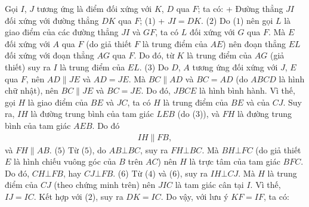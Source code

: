 \begin{multicols}{2}
\begin{figure}[H]
		\vspace*{-10pt}
	\end{figure}
	Gọi $I$, $J$ tương ứng là điểm đối xứng với $K$, $D$ qua $F$; ta có:
	\vskip 0.05cm
	+ Đường thẳng $JI$ đối xứng với đường thẳng $DK$ qua $F$; \hfill ($1$)
	\vskip 0.05cm
	+ $JI = DK$. \hfill ($2$)
	\vskip 0.05cm
	Do ($1$) nên gọi $L$ là giao điểm của các đường thẳng $JI$ và $GF$, ta có $L$ đối xứng với $G$ qua $F$. Mà $E$ đối xứng với $A$ qua $F$ (do giả thiết $F$ là trung điểm của $AE$) nên đoạn thẳng $EL$ đối xứng với đoạn thẳng $AG$ qua $F$. Do đó, từ $K$ là trung điểm của $AG$ (giả thiết) suy ra $I$ là trung điểm của $EL$. \hfill ($3$)
	\vskip 0.05cm
	Do $D$, $A$ tương ứng đối xứng với $J$, $E$ qua $F$, nên $AD \parallel JE$ và $AD = JE$. Mà $BC \parallel AD$ và $BC = AD$ (do $ABCD$ là hình chữ nhật), nên $BC \parallel JE$ và $BC = JE$. Do đó, $JBCE$ là hình bình hành. Vì thế, gọi $H$ là giao điểm của $BE$ và $JC$, ta có $H$ là trung điểm của $BE$ và của $CJ$. Suy ra, $IH$ là đường trung bình của tam giác $LEB$ (do ($3$)), và $FH$ là đường trung bình của tam giác $AEB$. Do đó
	\begin{align*}
		IH \parallel FB, \tag{$4$}
	\end{align*}
	và \hspace*{60.5pt}  $FH \parallel AB$. \hfill ($5$)
	\vskip 0.05cm
	Từ ($5$), do $AB \bot BC$, suy ra $FH \bot BC$. Mà $BH \bot FC$ (do giả thiết $E$ là hình chiếu vuông góc của $B$ trên $AC$) nên $H$ là trực tâm của tam giác $BFC$. Do đó, $CH \bot FB$, hay $CJ \bot FB$. \hfill ($6$)
	\vskip 0.05cm
	Từ ($4$) và ($6$), suy ra $IH \bot CJ$. Mà $H$ là trung điểm của $CJ$ (theo chứng minh trên) nên $JIC$ là tam giác cân tại $I$. Vì thế, $IJ = IC$. Kết hợp với ($2$), suy ra $DK = IC$. Do vậy, với lưu ý $KF = IF$, ta có:

\end{multicols}
